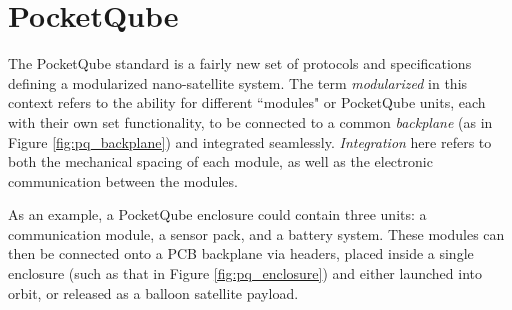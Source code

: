 \graphicspath{{./figures}}

\section{PocketQube}

The PocketQube standard is a fairly new set of protocols and specifications defining a modularized nano-satellite system. The term \textit{modularized} in this context refers to the ability for different ``modules" or PocketQube units, each with their own set functionality, to be connected to a common \textit{backplane} (as in Figure \ref{fig:pq_backplane}) and integrated seamlessly. \textit{Integration} here refers to both the mechanical spacing of each module, as well as the electronic communication between the modules.

As an example, a PocketQube enclosure could contain three units: a communication module, a sensor pack, and a battery system. These modules can then be connected onto a PCB backplane via headers, placed inside a single enclosure (such as that in Figure \ref{fig:pq_enclosure}) and either launched into orbit, or released as a balloon satellite payload.